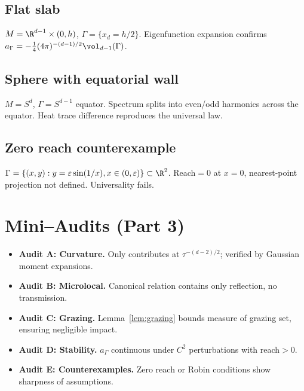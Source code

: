 \subsection{Flat slab}
$M=\R^{d-1}\times(0,h)$, $\Gamma=\{x_d=h/2\}$. Eigenfunction expansion confirms $a_\Gamma=-\tfrac14(4\pi)^{-(d-1)/2}\vol_{d-1}(\Gamma)$.

\subsection{Sphere with equatorial wall}
$M=S^d$, $\Gamma=S^{d-1}$ equator. Spectrum splits into even/odd harmonics across the equator. Heat trace difference reproduces the universal law.

\subsection{Zero reach counterexample}
$\Gamma=\{(x,y): y=\varepsilon\sin(1/x), x\in(0,\varepsilon)\}\subset\R^2$. Reach$=0$ at $x=0$, nearest-point projection not defined. Universality fails.

\section{Mini–Audits (Part 3)}
\label{sec:mini-audit-part3}

\begin{itemize}
  \item \textbf{Audit A: Curvature.} Only contributes at $\tau^{-(d-2)/2}$; verified by Gaussian moment expansions.
  \item \textbf{Audit B: Microlocal.} Canonical relation contains only reflection, no transmission.
  \item \textbf{Audit C: Grazing.} Lemma~\ref{lem:grazing} bounds measure of grazing set, ensuring negligible impact.
  \item \textbf{Audit D: Stability.} $a_\Gamma$ continuous under $C^2$ perturbations with reach$>0$.
  \item \textbf{Audit E: Counterexamples.} Zero reach or Robin conditions show sharpness of assumptions.
\end{itemize}


